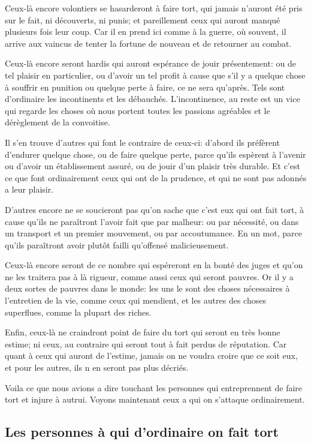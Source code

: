 Ceux-là encore volontiers se hasarderont à faire tort, qui jamais n'auront été pris sur le fait, ni découverts,
ni punis; et pareillement ceux qui auront manqué plusieurs fois leur coup. Car il en prend ici comme à la
guerre, où souvent, il arrive aux vaincus de tenter la fortune de nouveau et de retourner au combat.

Ceux-là encore seront hardis qui auront espérance de jouir présentement: ou de tel plaisir en particulier, ou
d'avoir un tel profit à cause que s'il y a quelque chose à souffrir en punition ou quelque perte à faire, ce
ne sera qu'après. Tels sont d'ordinaire les incontinents et les débauchés. L'incontinence, au reste est un vice
qui regarde les choses où nous portent toutes les passions agréables et le dérèglement de la convoitise.

Il s'en trouve d'autres qui font le contraire de ceux-ci: d'abord ils préfèrent d'endurer quelque chose, ou de
faire quelque perte, parce qu'ils espèrent à l'avenir ou d'avoir un établissement assuré, ou de jouir d'un plaisir
très durable. Et c'est ce que font ordinairement ceux qui ont de la prudence, et qui ne sont pas adonnés a leur
plaisir. 

D'autres encore ne se soucieront pas qu'on sache que c'est eux qui ont fait tort, à cause qu'ils ne paraîtront
l'avoir fait que par malheur: ou par nécessité, ou dans un transport et un premier mouvement, ou par accoutumance.
En un mot, parce qu'ils paraîtront avoir plutôt failli qu'offensé malicieusement.

Ceux-là encore seront de ce nombre qui espéreront en la bonté des juges et qu'on ne les traitera pas à là rigueur,
comme aussi ceux qui seront pauvres. Or il y a deux sortes de pauvres dans le monde: les uns le sont des choses
nécessaires à l'entretien de la vie, comme ceux qui mendient, et les autres des choses superflues, comme la plupart
des riches. 

Enfin, ceux-là ne craindront point de faire du tort qui seront en très bonne estime; ni ceux, au contraire qui
seront tout à fait perdus de réputation. Car quant à ceux qui auront de l'estime, jamais on ne voudra croire que
ce soit eux, et pour les autres, ils n en seront pas plus décriés.

Voila ce que nous avions a dire touchant les personnes qui entreprennent de faire tort et injure à autrui. Voyons
maintenant ceux a qui on s'attaque ordinairement.

\subsection{Les personnes à qui d'ordinaire on fait tort}

